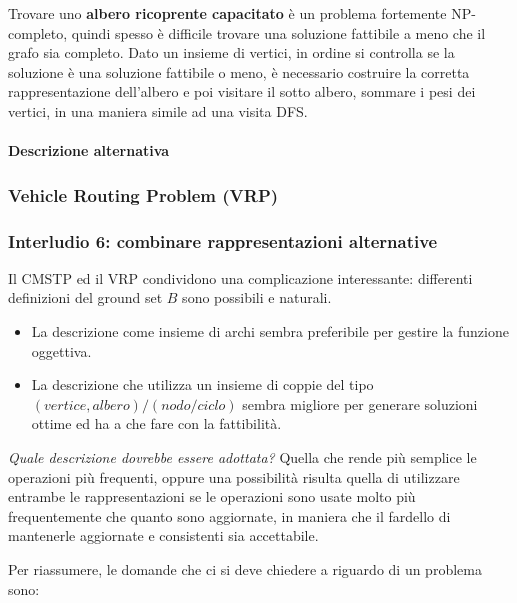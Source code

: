 \documentclass{article}
\begin{document}
Trovare uno \textbf{albero ricoprente capacitato} è un problema fortemente NP-completo, quindi spesso
è difficile trovare una soluzione fattibile a meno che il grafo sia completo. Dato un insieme di vertici,
in ordine si controlla se la soluzione è una soluzione fattibile o meno, è necessario costruire
la corretta rappresentazione dell'albero e poi visitare il sotto albero, sommare i pesi dei vertici, in
una maniera simile ad una visita DFS. \paragraph{Descrizione alternativa}

\subsubsection{Vehicle Routing Problem (VRP)}
\subsubsection{Interludio 6: combinare rappresentazioni alternative}
Il CMSTP ed il VRP condividono una complicazione interessante: differenti definizioni del
ground set $B$ sono possibili e naturali.
\begin{itemize}
    \item La descrizione come insieme di archi sembra preferibile per gestire la funzione oggettiva.
    \item La descrizione che utilizza un insieme di coppie del tipo
          \newline$(vertice, albero)/(nodo/ciclo)$ sembra migliore per generare
          soluzioni ottime ed ha a che fare con la fattibilità.
\end{itemize}

\noindent\textit{Quale descrizione dovrebbe essere adottata?} Quella che rende più semplice le operazioni più frequenti, oppure una possibilità risulta
quella di utilizzare entrambe le rappresentazioni se le operazioni sono usate molto più frequentemente
che quanto sono aggiornate, in maniera che il fardello di mantenerle aggiornate e consistenti sia accettabile.

Per riassumere, le domande che ci si deve chiedere a riguardo di un problema sono:
\end{document}
